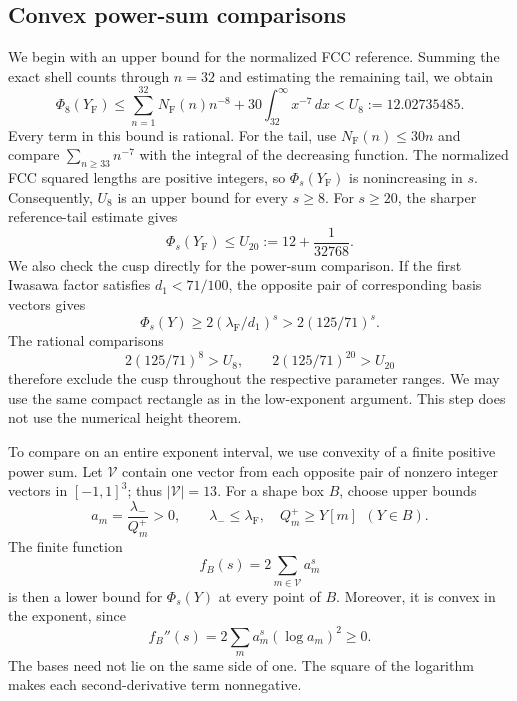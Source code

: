 \documentclass[reqno,english]{amsart}
\theoremstyle{definition}
\newtheorem{open problem}[theorem]{Open Problem}
\theoremstyle{remark}
\theoremstyle{plain}
\numberwithin{equation}{section}
\newcommand{\YF}{Y_{\mathrm F}}
\newcommand{\lam}{\lambda_{\mathrm F}}
\begin{document}
\subsection{Convex power-sum comparisons}\label{E:sec:power-cert}
We begin with an upper bound for the normalized FCC reference.
Summing the exact shell counts through $n=32$ and estimating the
remaining tail, we obtain
\begin{equation}
 \Phi_8(\YF)
 \le \sum_{n=1}^{32}N_{\mathrm F}(n)n^{-8}
       +30\int_{32}^{\infty}x^{-7}\,dx
 < U_8:=12.02735485.
 \label{E:eq:U8}
\end{equation}
Every term in this bound is rational. For the tail, use
$N_{\mathrm F}(n)\le30n$ and compare
$\sum_{n\ge33}n^{-7}$ with the integral of the decreasing function.
The normalized FCC squared lengths are positive integers, so
$\Phi_s(\YF)$ is nonincreasing in $s$. Consequently, $U_8$ is
an upper bound for every $s\ge8$. For $s\ge20$, the sharper
reference-tail estimate gives
\begin{equation}
 \Phi_s(\YF)\le U_{20}:=12+\frac1{32768}.
 \label{E:eq:U20}
\end{equation}
We also check the cusp directly for the power-sum comparison.
If the first Iwasawa factor satisfies $d_1<71/100$, the opposite
pair of corresponding basis vectors gives
\[
 \Phi_s(Y)\ge2(\lam/d_1)^s>2(125/71)^s.
\]
The rational comparisons
\[
 2(125/71)^8>U_8,\qquad2(125/71)^{20}>U_{20}
\]
therefore exclude the cusp throughout the respective parameter
ranges. We may use the same compact rectangle as in the low-exponent
argument. This step does not use the numerical height theorem.

To compare on an entire exponent interval, we use convexity of a
finite positive power sum. Let $\mathcal V$ contain one vector from
each opposite pair of nonzero integer vectors in $[-1,1]^3$; thus
$|\mathcal V|=13$. For a shape box $B$, choose upper bounds
\[
 a_m=\frac{\lambda_-}{Q_m^+}>0,\qquad
 \lambda_-\le\lam,\quad Q_m^+\ge Y[m]\ \ (Y\in B).
\]
The finite function
\begin{equation}
 f_B(s)=2\sum_{m\in\mathcal V}a_m^s
 \label{E:eq:fixed-base-sum}
\end{equation}
is then a lower bound for $\Phi_s(Y)$ at every point of $B$.
Moreover, it is convex in the exponent, since
\begin{equation}
 f_B''(s)=2\sum_m a_m^s(\log a_m)^2\ge0.
 \label{E:eq:exponent-convexity}
\end{equation}
The bases need not lie on the same side of one. The square of
the logarithm makes each second-derivative term nonnegative.
\end{document}
